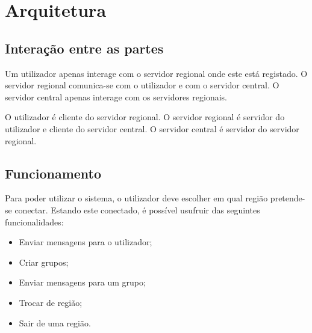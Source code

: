 \chapter{Arquitetura}

\section{Interação entre as partes}
Um utilizador apenas interage com o servidor regional onde este está registado. O servidor regional comunica-se com o utilizador e com o servidor central. O servidor central apenas interage com os servidores regionais.

\begin{figure}[h]
\end{figure}

O utilizador é cliente do servidor regional. O servidor regional é servidor do utilizador e cliente do servidor central. O servidor central é servidor do servidor regional.

\section{Funcionamento}
Para poder utilizar o sistema, o utilizador deve escolher em qual região pretende-se conectar. Estando este conectado, é possível usufruir das seguintes funcionalidades:
\begin{itemize}
	\item Enviar mensagens para o utilizador;
	\item Criar grupos;
	\item Enviar mensagens para um grupo;
	\item Trocar de região;
	\item Sair de uma região.
\end{itemize}

